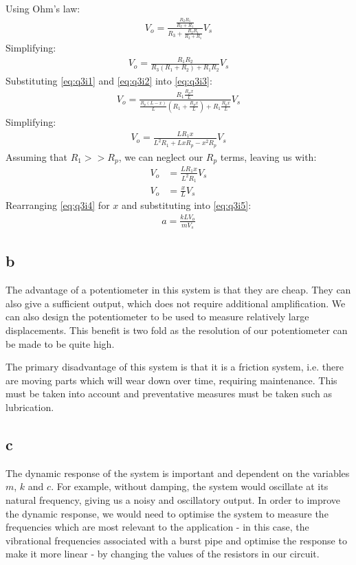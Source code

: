 \documentclass[11pt]{article}
\numberwithin{equation}{section}
\begin{document}
Using Ohm's law:
\begin{align}
    V_o = \frac{\frac{R_2 R_1}{R_2 + R_1}}{R_3 + \frac{R_2 R_1}{R_2 + R_1}}V_s
\end{align}
Simplifying:
\begin{align}
    V_o= \frac{R_1 R_2}{R_3\left(R_1 + R_2\right) + R_1 R_2}V_s \label{eq:q3i3}
\end{align}
Substituting \ref{eq:q3i1} and \ref{eq:q3i2} into \ref{eq:q3i3}:
\begin{align}
    V_o= \frac{R_1\frac{R_p x}{L}}{\frac{R_p (L-x)}{L}\left(R_1 + \frac{R_p x}{L}\right) + R_1 \frac{R_p x}{L}}V_s 
\end{align}
Simplifying:
\begin{align}
    V_o = \frac{LR_1 x}{L^2 R_1 + LxR_p - x^2 R_p}V_s
\end{align}
Assuming that $R_1 >> R_p$, we can neglect our $R_p$ terms, leaving us with:
\begin{align}
    V_o &= \frac{LR_1 x}{L^2 R_1}V_s\\
    V_o &= \frac{x}{L}V_s \label{eq:q3i4}
\end{align}
Rearranging \ref{eq:q3i4} for $x$ and substituting into \ref{eq:q3i5}:
\begin{align}
    a = \frac{kLV_o}{mV_s}
\end{align}
\subsection{b}
The advantage of a potentiometer in this system is that they are cheap. They can also give a sufficient output, which does not require additional amplification. We can also design the potentiometer to be used to measure relatively large displacements. This benefit is two fold as the resolution of our potentiometer can be made to be quite high.

The primary disadvantage of this system is that it is a friction system, i.e. there are moving parts which will wear down over time, requiring maintenance. This must be taken into account and preventative measures must be taken such as lubrication. 
\subsection{c}
The dynamic response of the system is important and dependent on the variables $m$, $k$ and $c$. For example, without damping, the system would oscillate at its natural frequency, giving us a noisy and oscillatory output. In order to improve the dynamic response, we would need to optimise the system to measure the frequencies which are most relevant to the application - in this case, the vibrational frequencies associated with a burst pipe and optimise the response to make it more linear - by changing the values of the resistors in our circuit. 
\end{document}
